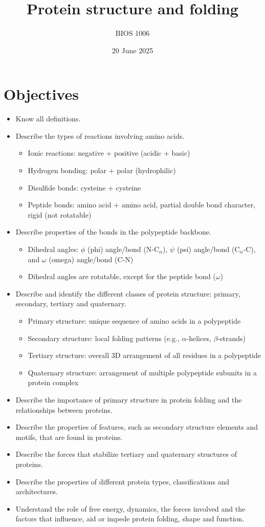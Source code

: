 \documentclass[letterpaper, 12pt]{article}
\title{Protein structure and folding}
\author{BIOS 1006}
\date{20 June 2025}
\begin{document}
\maketitle

\section*{Objectives}

\begin{itemize}
\item Know all definitions.
\item Describe the types of reactions involving amino acids.
\begin{itemize}
\item Ionic reactions: negative + positive (acidic + basic)
\item Hydrogen bonding: polar + polar (hydrophilic)
\item Disulfide bonds: cysteine + cysteine
\item Peptide bonds: amino acid + amino acid, partial double bond character, rigid (not rotatable)
\end{itemize}
\item Describe properties of the bonds in the polypeptide backbone.
\begin{itemize}
\item Dihedral angles: $\phi$ (phi) angle/bond (N-C$_\alpha$), $\psi$ (psi) angle/bond (C$_\alpha$-C), and $\omega$ (omega) angle/bond (C-N)
\item Dihedral angles are rotatable, except for the peptide bond ($\omega$)
\end{itemize}
\item Describe and identify the different classes of protein structure: primary, secondary, tertiary and quaternary.
\begin{itemize}
\item Primary structure: unique sequence of amino acids in a polypeptide
\item Secondary structure: local folding patterns (e.g., $\alpha$-helices, $\beta$-strands)
\item Tertiary structure: overall 3D arrangement of all residues in a polypeptide
\item Quaternary structure: arrangement of multiple polypeptide subunits in a protein complex
\end{itemize}
\item Describe the importance of primary structure in protein folding and the relationships between proteins.
\item Describe the properties of features, such as secondary structure elements and motifs, that are found in proteins.
\item Describe the forces that stabilize tertiary and quaternary structures of proteins.
\item Describe the properties of different protein types, classifications and architectures.
\item Understand the role of free energy, dynamics, the forces involved and the factors that influence, aid or impede protein folding, shape and function.
\end{itemize}
\end{document}

